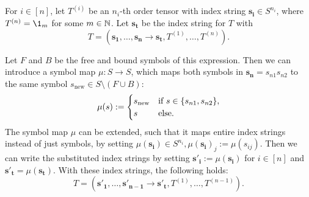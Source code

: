 \begin{lemma}
    \label{lemma:nested_einsum:3}
    For $i \in [n]$, let $T^{(i)}$ be an $n_i$-th order tensor with index string $\bm{s_i} \in S^{n_i}$,
    where $T^{(n)} = \1_m$ for some $m \in \mathbb{N}$.
    Let $\bm{s_t}$ be the index string for $T$ with
    $$T = (\bm{s_1}, \dots, \bm{s_n} \rightarrow \bm{s_t}, T^{(1)}, \dots, T^{(n)}).$$

    Let $F$ and $B$ be the free and bound symbols of this expression.
    Then we can introduce a symbol map $\mu: S \rightarrow S$, which maps both symbols in $\bm{s_n} = s_{n1}s_{n2}$ to the same symbol $s_{\text{new}} \in S \setminus (F \cup B)$:
    $$\mu(s) := \begin{cases}
            s_{\text{new}} & \text{if $s \in \lbrace s_{n1}, s_{n2} \rbrace$}, \\
            s              & \text{else}.
        \end{cases}$$
    The symbol map $\mu$ can be extended, such that it maps entire index strings instead of just symbols, by setting $\mu(\bm{s_i}) \in S^{n_i}, \mu(\bm{s_i})_j := \mu(s_{ij})$.
    Then we can write the substituted index strings by setting $\bm{s'_i} := \mu(\bm{s_i})$ for $i \in [n]$ and $\bm{s'_t} = \mu(\bm{s_t})$.
    With these index strings, the following holds:
    $$T = (\bm{s'_1}, \dots, \bm{s'_{n - 1}} \rightarrow \bm{s'_t}, T^{(1)}, \dots, T^{(n - 1)}).$$
\end{lemma}

